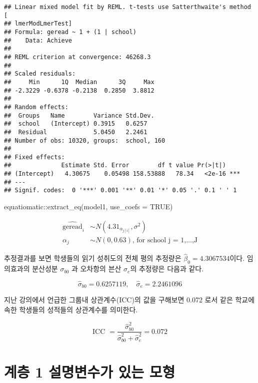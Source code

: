 \documentclass[
]{book}
\newenvironment{Shaded}{\begin{snugshade}}{\end{snugshade}}
\newcommand{\AttributeTok}[1]{\textcolor[rgb]{0.77,0.63,0.00}{#1}}
\newcommand{\ConstantTok}[1]{\textcolor[rgb]{0.00,0.00,0.00}{#1}}
\newcommand{\FunctionTok}[1]{\textcolor[rgb]{0.00,0.00,0.00}{#1}}
\newcommand{\NormalTok}[1]{#1}
\newcommand{\SpecialCharTok}[1]{\textcolor[rgb]{0.00,0.00,0.00}{#1}}
\begin{document}
\begin{verbatim}
## Linear mixed model fit by REML. t-tests use Satterthwaite's method [
## lmerModLmerTest]
## Formula: geread ~ 1 + (1 | school)
##    Data: Achieve
## 
## REML criterion at convergence: 46268.3
## 
## Scaled residuals: 
##     Min      1Q  Median      3Q     Max 
## -2.3229 -0.6378 -0.2138  0.2850  3.8812 
## 
## Random effects:
##  Groups   Name        Variance Std.Dev.
##  school   (Intercept) 0.3915   0.6257  
##  Residual             5.0450   2.2461  
## Number of obs: 10320, groups:  school, 160
## 
## Fixed effects:
##              Estimate Std. Error        df t value Pr(>|t|)    
## (Intercept)   4.30675    0.05498 158.53888   78.34   <2e-16 ***
## ---
## Signif. codes:  0 '***' 0.001 '**' 0.01 '*' 0.05 '.' 0.1 ' ' 1
\end{verbatim}

\begin{Shaded}
\begin{Highlighting}[]
\NormalTok{equatiomatic}\SpecialCharTok{::}\FunctionTok{extract\_eq}\NormalTok{(model1, }\AttributeTok{use\_coefs =} \ConstantTok{TRUE}\NormalTok{)}
\end{Highlighting}
\end{Shaded}

\[
\begin{aligned}
  \operatorname{\widehat{geread}}_{i}  &\sim N \left(4.31_{\alpha_{j[i]}}, \sigma^2 \right) \\
    \alpha_{j}  &\sim N \left(0, 0.63 \right)
    \text{, for school j = 1,} \dots \text{,J}
\end{aligned}
\]

추정결과를 보면 학생들의 읽기 성취도의 전체 평의 추정량은 \(\hat \beta_0= 4.3067534\)이다.
임의효과의 분산성분 \(\sigma_{b0}\) 과 오차항의 븐산 \(\sigma_e\)의 추정량은 다음과 같다.

\[ \hat {\sigma}_{b0} = 0.6257119 , \quad
\hat {\sigma}_{e} = 2.2461096 \]

지난 강의에서 언급한 그룹내 상관계수(ICC)의 값을 구해보면 0.072 로서 같은 학교에 속한 학생들의 성적들의 상관계수를 의미한다.

\[ \text{ICC } = \frac{\hat {\sigma}^2_{b0} }{\hat {\sigma}^2_{b0} + \hat {\sigma}^2_{e}  }
 = 0.072 \]

\hypertarget{uxacc4uxce35-1-uxc124uxba85uxbcc0uxc218uxac00-uxc788uxb294-uxbaa8uxd615}{%
\section{계층 1 설명변수가 있는 모형}\label{uxacc4uxce35-1-uxc124uxba85uxbcc0uxc218uxac00-uxc788uxb294-uxbaa8uxd615}}
\end{document}
